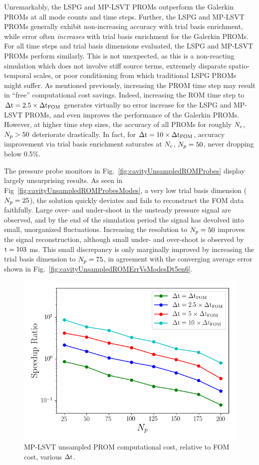 Unremarkably, the LSPG and MP-LSVT PROMs outperform the Galerkin PROMs at all mode counts and time steps. Further, the LSPG and MP-LSVT PROMs generally exhibit non-increasing accuracy with trial basis enrichment, while error often \textit{increases} with trial basis enrichment for the Galerkin PROMs. For all time steps and trial basis dimensions evaluated, the LSPG and MP-LSVT PROMs perform similarly. This is not unexpected, as this is a non-reacting simulation which does not involve stiff source terms, extremely disparate spatio-temporal scales, or poor conditioning from which traditional LSPG PROMs might suffer. As mentioned previously, increasing the PROM time step may result in ``free'' computational cost savings. Indeed, increasing the ROM time step to $\Delta \text{t} = 2.5 \times \Delta \text{t}_{\text{FOM}}$ generates virtually no error increase for the LSPG and MP-LSVT PROMs, and even improves the performance of the Galerkin PROMs. However, at higher time step sizes, the accuracy of all PROMs for roughly $N_c$, $N_p > 50$ deteriorate drastically. In fact, for $\Delta \text{t} = 10 \times \Delta \text{t}_{\text{FOM}}$, accuracy improvement via trial basis enrichment saturates at $N_c$, $N_p = 50$, never dropping below 0.5\%.

The pressure probe monitors in Fig.~\ref{fig:cavityUnsampledROMProbes} display largely unsurprising results. As seen in Fig~\ref{fig:cavityUnsampledROMProbesModes}, a very low trial basis dimension ($N_p = 25$), the solution quickly deviates and fails to reconstruct the FOM data faithfully. Large over- and under-shoot in the unsteady pressure signal are observed, and by the end of the simulation period the signal has devolved into small, unorganized fluctuations. Increasing the resolution to $N_p = 50$ improves the signal reconstruction, although small under- and over-shoot is observed by $\text{t} = 103$ ms. This small discrepancy is only marginally improved by increasing the trial basis dimension to $N_p = 75$, in agreement with the converging average error shown in Fig.~\ref{fig:cavityUnsampledROMErrVsModesDt5en6}.

\begin{figure}
    \centering
    \includegraphics[width=0.7\linewidth]{Chapters/CavityAndCVRC/Images/cavity/unsampled/unsampled_modeStudy_time_calcAndMPI.png}
    \caption{\label{fig:cavityUnsampledCost}MP-LSVT unsampled PROM computational cost, relative to FOM cost, various $\Delta \text{t}$.}
\end{figure}

